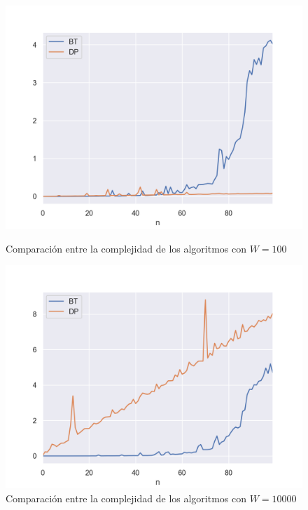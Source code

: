 \begin{figure}[H]
   \begin{minipage}{0.5\textwidth}
     \centering
     \includegraphics[width=0.9\linewidth]{img/bt_dp_100_Figure_1}
     \caption{Comparación entre la complejidad de los algoritmos con $W = 100$ }
   \end{minipage}\hfill
   \begin{minipage}{0.5\textwidth}
     \centering
     \includegraphics[width=0.9\linewidth]{img/bt_dp_10000_Figure_1}
     \caption{Comparación entre la complejidad de los algoritmos con $W = 10000$}
   \end{minipage}
\end{figure}



